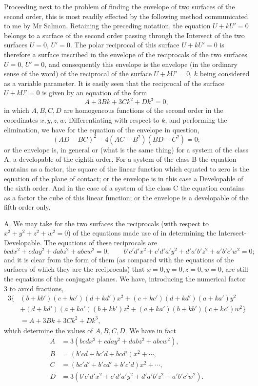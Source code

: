 \documentclass[11pt]{article}
\begin{document}
Proceeding next to the problem of finding the envelope of two surfaces of the second
order, this is most readily effected by the following method communicated to me by
Mr Salmon. Retaining the preceding notation, the equation $U+kU'=0$ belongs to a
surface of the second order passing through the Intersect of the two surfaces $U=0$,
$U'=0$. The polar reciprocal of this surface $U+kU'=0$ is therefore a surface
inscribed in the envelope of the reciprocals of the two surfaces $U=0$, $U'=0$, and
consequently this envelope is the envelope (in the ordinary sense of the word) of the
reciprocal of the surface $U+kU'=0$, $k$ being considered as a variable parameter.
It is easily seen that the reciprocal of the surface $U+kU'=0$ is given by an equation
of the form
\[
        A+3Bk+3Ck^2+Dk^3=0,
\]
in which $A,B,C,D$ are homogeneous functions of the second order in the coordinates
$x,y,z,w$. Differentiating with respect to $k$, and performing the elimination, we
have for the equation of the envelope in question,
\[
        (AD-BC)^2-4(AC-B^2)(BD-C^2)=0;
\]
or the envelope is, in general or (what is the same thing) for a system of the class
A, a developable of the eighth order. For a system of the class B the equation
contains as a factor, the square of the linear function which equated to zero is the
equation of the plane of contact; or the envelope is in this case a Developable of the
sixth order. And in the case of a system of the class C the equation contains as a
factor the cube of this linear function; or the envelope is a developable of the fifth
order only.

A. We may take for the two surfaces the reciprocals (with respect to
$x^2+y^2+z^2+w^2=0$) of the equations made use of in determining the
Intersect-Developable. The equations of these reciprocals are
\[
        bcdx^2+cday^2+dabz^2+abcw^2=0,\qquad
        b'c'd'x^2+c'd'a'y^2+d'a'b'z^2+a'b'c'w^2=0;
\]
and it is clear from the form of them (as compared with the equations of the
surfaces of which they are the reciprocals) that $x=0,y=0,z=0,w=0$, are still the
equations of the conjugate planes. We have, introducing the numerical factor $3$ to
avoid fractions,
\[
\begin{aligned}
3\{&(b+kb')(c+kc')(d+kd')x^2
 +(c+kc')(d+kd')(a+ka')y^2\\
& +(d+kd')(a+ka')(b+kb')z^2
 +(a+ka')(b+kb')(c+kc')w^2\}\\
&=A+3Bk+3Ck^2+Dk^3,
\end{aligned}
\]
which determine the values of $A,B,C,D$. We have in fact
\[
\begin{aligned}
A&=3(bcdx^2+cday^2+dabz^2+abcw^2),\\
B&=(b'cd+bc'd+bcd')x^2+\cdots,\\
C&=(bc'd'+b'cd'+b'c'd)x^2+\cdots,\\
D&=3(b'c'd'x^2+c'd'a'y^2+d'a'b'z^2+a'b'c'w^2).
\end{aligned}
\]
\end{document}

